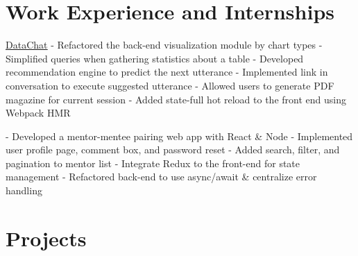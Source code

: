 \documentclass[letterpaper]{twentysecondcv} %
\begin{document}

\section{Work Experience and Internships}

\begin{twenty} %
    {\href{https://datachat.ai/}{\underline{{DataChat}}}}
    {
    - Refactored the back-end visualization module by chart types \newline
    - Simplified queries when gathering statistics about a table\newline
    - Developed recommendation engine to predict the next utterance\newline
    - Implemented link in conversation to execute suggested utterance \newline
    - Allowed users to generate PDF magazine for current session\newline
    - Added state-full hot reload to the front end using Webpack HMR 
    }
	
	{
	- Developed a mentor-mentee pairing web app with React \& Node\newline
	- Implemented user profile page, comment box, and password reset \newline
	- Added search, filter, and pagination to mentor list \newline
	- Integrate Redux to the front-end for state management \newline
	- Refactored  back-end to use async/await \& centralize error handling
	}
\end{twenty}


\section{Projects}
\end{document}
